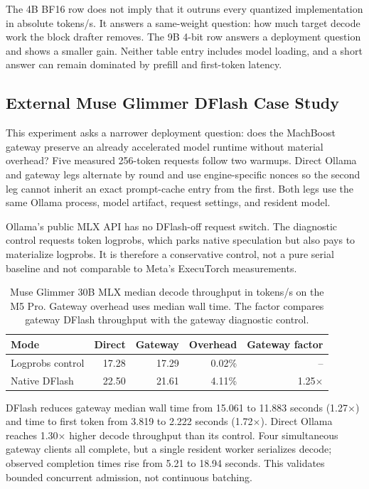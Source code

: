 \documentclass[11pt]{article}
\begin{document}
The 4B BF16 row does not imply that it outruns every quantized implementation in
absolute tokens/s. It answers a same-weight question: how much target decode work
the block drafter removes. The 9B 4-bit row answers a deployment question and
shows a smaller gain. Neither table entry includes model loading, and a short
answer can remain dominated by prefill and first-token latency.

\subsection{External Muse Glimmer DFlash Case Study}
This experiment asks a narrower deployment question: does the MachBoost gateway
preserve an already accelerated model runtime without material overhead? Five
measured 256-token requests follow two warmups. Direct Ollama and gateway legs
alternate by round and use engine-specific nonces so the second leg cannot
inherit an exact prompt-cache entry from the first. Both legs use the same
Ollama process, model artifact, request settings, and resident model.

Ollama's public MLX API has no DFlash-off request switch. The diagnostic control
requests token logprobs, which parks native speculation but also pays to
materialize logprobs. It is therefore a conservative control, not a pure serial
baseline and not comparable to Meta's ExecuTorch measurements.

\begin{table}[H]
\centering
\small
\begin{tabular}{lrrrr}
\toprule
Mode & Direct & Gateway & Overhead & Gateway factor \\
\midrule
Logprobs control & 17.28 & 17.29 & 0.02\% & -- \\
Native DFlash & 22.50 & 21.61 & 4.11\% & 1.25$\times$ \\
\bottomrule
\end{tabular}
\caption{Muse Glimmer 30B MLX median decode throughput in tokens/s on the M5
Pro. Gateway overhead uses median wall time. The factor compares gateway
DFlash throughput with the gateway diagnostic control.}
\label{tab:muse}
\end{table}

DFlash reduces gateway median wall time from 15.061 to 11.883 seconds
(1.27$\times$) and time to first token from 3.819 to 2.222 seconds
(1.72$\times$). Direct Ollama reaches 1.30$\times$ higher decode throughput
than its control. Four simultaneous gateway clients all complete, but a single
resident worker serializes decode; observed completion times rise from 5.21 to
18.94 seconds. This validates bounded concurrent admission, not continuous
batching.
\end{document}
